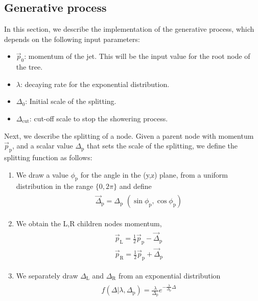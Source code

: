 \documentclass[12pt]{article}
\newcommand{\bea}{\begin{eqnarray}\begin{aligned}}
\newcommand{\eea}{\end{aligned}\end{eqnarray}}
\begin{document}
\subsection{Generative process}

In this section, we describe the implementation of the generative process, which depends on the following input parameters:
\begin{itemize}

\item $\vec{p}_0$: momentum of the jet. This will be the input value for the root node of the tree.
\item $\lambda$: decaying rate for the exponential distribution.
\item $\Delta_0$: Initial scale of the splitting. 
\item $\Delta_\text{cut}$: cut-off scale to stop the showering process. 

\end{itemize}

Next, we describe the splitting of a node.
Given a parent node with momentum $\vec{p}_\text{p}$, and a scalar value $\Delta_{\text{p}}$ that sets the scale of the splitting, we define the splitting function as follows:
\begin{enumerate}

\item We draw a value $\phi_\text{p}$ for the angle in the (y,z) plane, from a uniform distribution in the range $\{0,2\pi\}$ and define
\bea\label{eq:Deltavec}
\vec{\Delta}_\text{p}= \Delta_\text{p}\,\,(\sin\phi_\text{p},\cos\phi_\text{p})
\eea 

\item We obtain the L,R children nodes momentum,
\bea\label{eq:pLR}
\vec{p}_\text{L}= \frac{1}{2} \vec{p}_\text{p} - \vec{\Delta}_\text{p}  \\
\vec{p}_\text{R}= \frac{1}{2} \vec{p}_\text{p} +\vec{\Delta}_\text{p}
\eea

\item We separately draw $ \Delta_{\text{L}}$ and  $\Delta_{\text{R}}$ from an exponential distribution 
\bea \label{eq:exponential}
f(\Delta | \lambda, \Delta_{\text{p}})=\frac{\lambda}{ \Delta_{\text{p}}} e^{- \frac{\lambda}{ \Delta_{\text{p}}} \Delta} 
\eea
%

\end{enumerate}
\end{document}
